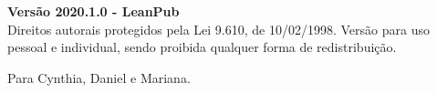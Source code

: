 \newpage
\thispagestyle{empty}
\vspace*{5cm}
\begin{center}
{\Large \bf  Versão 2020.1.0 - LeanPub}\\ 
\vspace*{1cm}
{\large Direitos autorais protegidos pela Lei 9.610, de 10/02/1998. Versão para  uso pessoal e individual, sendo proibida qualquer forma de redistribuição.}
\end{center}
\newpage

\newpage
\thispagestyle{empty}
\vspace*{5cm}
\begin{center}
\large Para Cynthia, Daniel e Mariana.
\end{center}
\newpage

\tableofcontents
